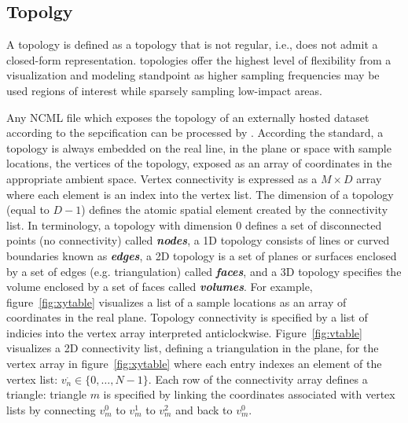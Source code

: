 \subsection{\ugrid{} Topolgy}
A \ugrid{} topology is  defined as a topology that is not regular, i.e.,
does not admit a closed-form representation. \ugrid{} topologies offer
the highest level of flexibility from a visualization and modeling
standpoint as higher sampling frequencies may be used regions of
interest while sparsely sampling low-impact areas.

Any NCML file which exposes the topology of an externally hosted
dataset according to the \cfugrid{} sepcification can be processed by
\sciwms{}. According the \cfugrid{} standard, a topology is always
embedded on the real line, in the plane or space with sample
locations, the vertices of the topology, exposed as an array of
coordinates in the appropriate ambient space. Vertex connectivity is
expressed as a $M \times D$ array where each element is an index into
the vertex list. The dimension of a topology (equal to $D - 1$) defines the
atomic spatial element created by the connectivity list. In \cfugrid{}
terminology, a topology with dimension 0 defines a set of disconnected
points (no connectivity) called \textbf{\textit{nodes}}, a 1D topology
consists of lines or curved boundaries known as
\textbf{\textit{edges}}, a 2D topology is a set of planes or surfaces
enclosed by a set of edges (e.g. triangulation) called
\textbf{\textit{faces}}, and a 3D topology specifies the volume enclosed
by a set of faces called \textbf{\textit{volumes}}.
For example, figure~\ref{fig:xytable} visualizes a list of a sample
locations as an array of coordinates in the real plane. Topology
connectivity is specified by a list of indicies into the vertex array
interpreted anticlockwise. Figure~\ref{fig:vtable} visualizes a 2D
connectivity list, defining a triangulation in the plane, for the
vertex array in figure~\ref{fig:xytable} where each entry indexes an
element of the vertex list: $v_n^{\cdot}\in \{0,\ldots,N-1\}$. Each
row of the connectivity array defines a triangle: triangle $m$ is
specified by linking the coordinates associated with vertex lists by
connecting $v^0_m$ to $v^1_m$ to $v^2_m$ and back to $v^0_m$.
